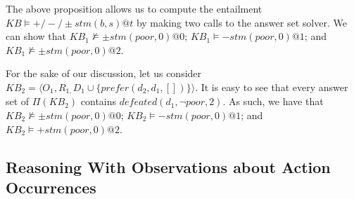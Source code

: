 \documentclass{article}
\newcommand{\memo}[1]{
  \ifthenelse {\boolean{includeMemo}}{\medskip\noindent\fbox{\begin{minipage}[b]{\dimexpr\linewidth-1em}#1\end{minipage}}\medskip\newline} 
}
\begin{document}
\medskip
The above proposition allows us to compute the entailment $KB \models {+}/{-}/{\pm} stm(b,s)@t$ by making two calls to the answer set solver. 
% 
We can show that  
 $KB_1 \not\models {\pm}stm(poor,0)@0$;
 $KB_1 \models   {-}stm(poor,0)@1$; and
 $KB_1 \not\models {\pm}stm(poor,0)@2$. 

%
%

For the sake of our discussion, let us consider $KB_2 = \langle  O_1 , R_{1,}D_1 \cup \{prefer(d_2,d_1,[])\} \rangle$. 
It is easy to see that  every  answer set of $\Pi(KB_2)$ contains $defeated(d_1, \neg poor, 2)$. As such, we have that 
$KB_2 \not\models {\pm}stm(poor,0)@0$;
 $KB_2 \models   {-}stm(poor,0)@1$; and
 $KB_2  \models {+}stm(poor,0)@2$. 
 
%
%


 
\subsection{Reasoning With Observations about Action Occurrences} 
\end{document}
